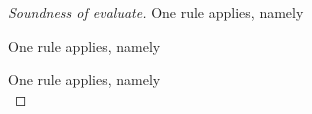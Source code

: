 \begin{proof}[Soundness of evaluate]
  { One rule applies, namely \\
    }

    {One rule applies, namely \\
   }

    {One rule applies, namely \\
    }


\end{proof}

